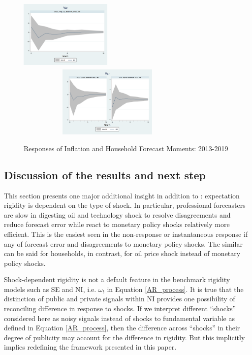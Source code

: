 \documentclass[]{article}
\begin{document}
\begin{figure}[ht]
		\smallskip 
		\includegraphics[width=4.5cm,height=3.5cm]{figures/SCEVar_ab_ashocks_nmpM.png} 
		\includegraphics[width=9cm,height=3.5cm]{figures/SCEVar_ab_ashocksM.png} 
		\caption{ Responses of Inflation and Household Forecast Moments: 2013-2019}
		\label{SCE_IR}
	\end{figure}
	
	\subsection{Discussion of the results and next step}
	
	This section presents one major additional insight in addition to \cite{coibion2012can}: expectation rigidity is dependent on the type of shock. In particular, professional forecasters are slow in digesting oil and technology shock to resolve disagreements and reduce forecast error while react to monetary policy shocks relatively more efficient. This is the easiest seen in the non-response or instantaneous response if any of forecast error and disagreements to monetary policy shocks. The similar can be said for households, in contrast, for oil price shock instead of monetary policy shocks.
	
	Shock-dependent rigidity is not a default feature in the benchmark rigidity models such as SE and NI, i.e. $\omega_t$ in Equation \ref{AR_process}. It is true that the distinction of public and private signals within NI provides one possibility of reconciling difference in response to shocks.  If we interpret different ``shocks'' considered here as noisy signals instead of shocks to fundamental variable as defined in Equation \ref{AR_process}, then the difference across ``shocks'' in their degree of publicity may account for the difference in rigidity.  But this implicitly implies redefining the  framework presented in this paper. 
	
\end{document}
